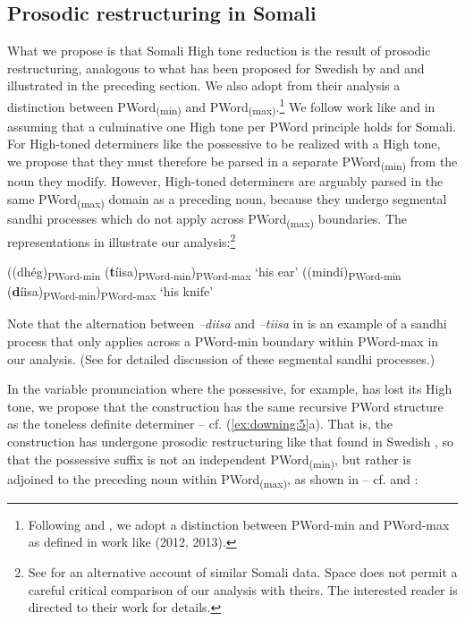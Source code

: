 \documentclass[output=paper]{langscibook}
\begin{document}
\subsection{Prosodic restructuring in Somali}

What we propose is that Somali High tone reduction is the result of prosodic restructuring, analogous to what has been proposed for Swedish by \citet{Myrberg2015} and \citet{Riad2016} and illustrated in the preceding section. We also adopt from their analysis a distinction between PWord\textsubscript{(min)} and PWord\textsubscript{(max)}.\footnote{Following \citet{Myrberg2015} and \citet{Riad2016}, we adopt a distinction between PWord-min and PWord-max as defined in work like \citet{Ito2012, Ito2013} (2012, 2013).} We follow work like \citet{Green2016,Hyman1981,Hyman2006, Hyman2012,LeGac2003} and \citet{Saeed2004} in assuming that a culminative one High tone per PWord principle holds for Somali. For High-toned determiners like the possessive to be realized with a High tone, we propose that they must therefore be parsed in a separate PWord\textsubscript{(min)} from the noun they modify. However, High-toned determiners are arguably parsed in the same PWord\textsubscript{(max)} domain as a preceding noun, because they undergo segmental sandhi processes which do not apply across PWord\textsubscript{(max)} boundaries. The representations in  illustrate our analysis:\footnote{See \citet{Green2016} for an alternative account of similar Somali data. Space does not permit a careful critical comparison of our analysis with theirs. The interested reader is directed to their work for details.}

\ea \label{ex:downing:18}
\ea ((dhég)\textsubscript{PWord-min} (\textbf{t}íisa)\textsubscript{PWord-min})\textsubscript{PWord-max}   ‘his ear’ \label{ex:downing:18a}
\ex ((mindí)\textsubscript{PWord-min} (\textbf{d}íisa)\textsubscript{PWord-min})\textsubscript{PWord-max} ‘his knife’ \label{ex:downing:18b}
\z
\z

Note that the alternation between \textit{–diisa} and \textit{–tiisa} in  is an example of a sandhi process that only applies across a PWord-min boundary within PWord-max in our analysis. (See \citet[28--31]{Saeed1999} for detailed discussion of these segmental sandhi processes.)

In the variable pronunciation where the possessive, for example, has lost its High tone, we propose that the construction has the same recursive PWord structure as the toneless definite determiner – cf. (\ref{ex:downing:5}a). That is, the construction has undergone prosodic restructuring like that found in Swedish , so that the possessive suffix is not an independent PWord\textsubscript{(min)}, but rather is adjoined to the preceding noun within PWord\textsubscript{(max)}, as shown in  – cf.   and :
\end{document}
